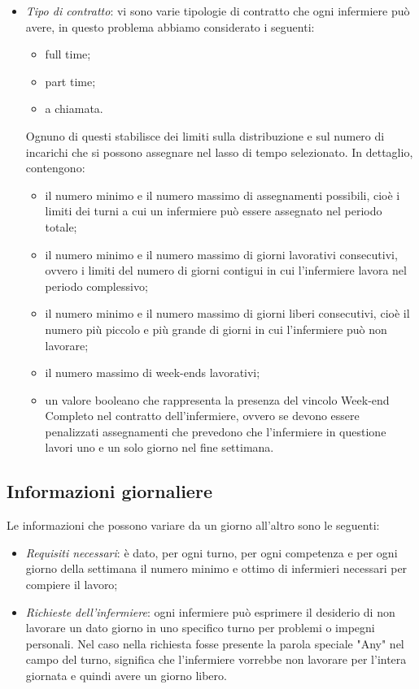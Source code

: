 \begin{itemize}
\item \textit{Tipo di contratto}: vi sono varie tipologie di contratto che ogni infermiere può avere, in questo problema abbiamo considerato i seguenti:
\begin{itemize}
\item full time;
\item part time;
\item a chiamata.
\end{itemize}
Ognuno di questi stabilisce dei limiti sulla distribuzione e sul numero di incarichi che si possono assegnare nel lasso di tempo selezionato. In dettaglio, contengono:
\begin{itemize}
\item il numero minimo e il numero massimo di assegnamenti possibili, cioè i limiti dei turni a cui un infermiere può essere assegnato nel periodo totale;
\item il numero minimo e il numero massimo di giorni lavorativi consecutivi, ovvero i limiti del numero di giorni contigui in cui l'infermiere lavora nel periodo complessivo;
\item il numero minimo e il numero massimo di giorni liberi consecutivi, cioè il numero più piccolo e più grande di giorni in cui l'infermiere può non lavorare;
\item il numero massimo di week-ends lavorativi;
\item un valore booleano che rappresenta la presenza del vincolo Week-end Completo nel contratto dell'infermiere, ovvero se devono essere penalizzati assegnamenti che prevedono che l'infermiere in questione lavori uno e un solo giorno nel fine settimana. 
\end{itemize}
\end{itemize}

\subsection{Informazioni giornaliere}
Le informazioni che possono variare da un giorno all'altro sono le seguenti:
\begin{itemize}
\item \textit{Requisiti necessari}: è dato, per ogni turno, per ogni competenza e per ogni giorno della settimana il numero minimo e ottimo di infermieri necessari per compiere il lavoro;
\item \textit{Richieste dell'infermiere}: ogni infermiere può esprimere il desiderio di non lavorare un dato giorno in uno specifico turno per problemi o impegni personali.
Nel caso nella richiesta fosse presente la parola speciale "Any" nel campo del turno, significa che l'infermiere vorrebbe non lavorare per l'intera giornata e quindi avere un giorno libero.
\end{itemize}

